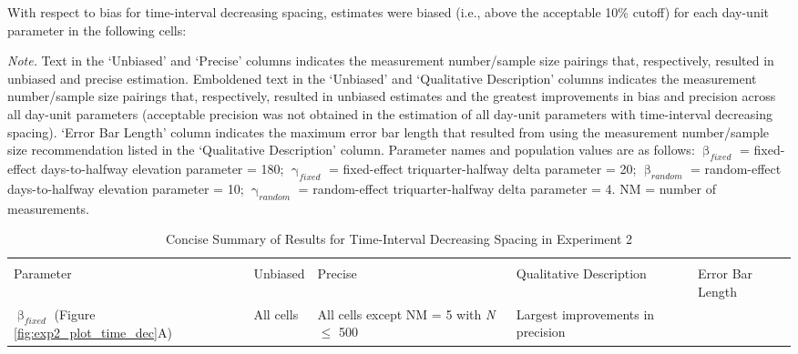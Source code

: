 \documentclass[
12pt, %
twoside,
english]{guelphthesis}
\begin{document}
With respect to bias for time-interval decreasing spacing, estimates were biased (i.e., above the acceptable 10\% cutoff) for each day-unit parameter in the following cells:

\begin{landscape}
\begin{ThreePartTable}
\begin{TableNotes}
\item \textit{Note. }Text in the `Unbiased' and `Precise' columns indicates the measurement number/sample size pairings that, respectively, resulted in unbiased and precise estimation. Emboldened text in the `Unbiased' and `Qualitative Description' columns indicates the measurement number/sample size pairings that, respectively, resulted in unbiased estimates and the greatest improvements in bias and precision across all day-unit parameters (acceptable precision was not obtained in the estimation of all day-unit parameters with time-interval decreasing spacing). `Error Bar Length' column indicates the maximum error bar length that resulted from using the measurement number/sample size recommendation listed in the `Qualitative Description' column. Parameter names and population values are as follows: $\upbeta_{fixed}$ = fixed-effect days-to-halfway elevation parameter = 180; $\upgamma_{fixed}$ = fixed-effect triquarter-halfway delta parameter = 20; $\upbeta_{random}$ = random-effect days-to-halfway elevation parameter = 10; $\upgamma_{random}$ = random-effect triquarter-halfway delta parameter = 4. NM = number of measurements.
\end{TableNotes}
\begin{longtable}[l]{>{\raggedright\arraybackslash}p{3cm}>{\raggedright\arraybackslash}p{5cm}>{\raggedright\arraybackslash}p{5cm}>{\raggedright\arraybackslash}p{6.5cm}>{\centering\arraybackslash}p{3cm}}
\caption{\label{tab:summary-table-time-dec-exp2}Concise Summary of Results for Time-Interval Decreasing Spacing in Experiment 2}\\
\toprule
\multicolumn{3}{c}{ } & \multicolumn{2}{c}{Description} \\
\cmidrule(l{3pt}r{3pt}){4-5}
Parameter & Unbiased & Precise & Qualitative Description & Error Bar Length\\
\midrule
\thead[lt]{$\upbeta_{fixed}$ \\ (Figure \ref{fig:exp2_plot_time_dec}A)} & All cells & All cells except NM = 5 with \textit{N} $\le$ 500 & \thead[lt]{Largest improvements in precision \\
}
\end{longtable}
\end{ThreePartTable}
\end{landscape}
\end{document}
